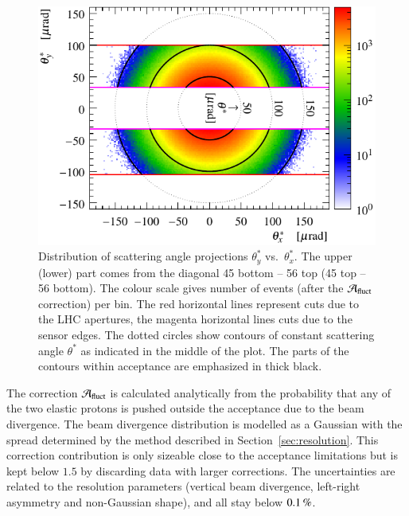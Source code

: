 \begin{figure}
\begin{center}
\includegraphics{fig/acc_corr_phi_lab.pdf}
\vskip-3mm
\caption{%
Distribution of scattering angle projections $\theta_y^*$ vs.~$\theta_x^*$. The upper (lower) part comes from the diagonal 45 bottom -- 56 top (45 top -- 56 bottom). The colour scale gives number of events (after the ${\cal A}_{\rm fluct}$ correction) per bin. The red horizontal lines represent cuts due to the LHC apertures, the magenta horizontal lines cuts due to the sensor edges. The dotted circles show contours of constant scattering angle $\theta^*$ as indicated in the middle of the plot. The parts of the contours within acceptance are emphasized in thick black.
}
\label{fig:acceptance principle}
\end{center}
\end{figure}


The correction ${\cal A}_{\rm fluct}$ is calculated analytically from the probability that any of the two elastic protons is pushed outside the acceptance due to the beam divergence. The beam divergence distribution is modelled as a Gaussian with the spread determined by the method described in Section~\ref{sec:resolution}. This correction contribution is only sizeable close to the acceptance limitations but is kept below $1.5$ by discarding data with larger corrections. The uncertainties are related to the resolution parameters (vertical beam divergence, left-right asymmetry and non-Gaussian shape), and all stay below $0.1\,{\rm \%}$.


